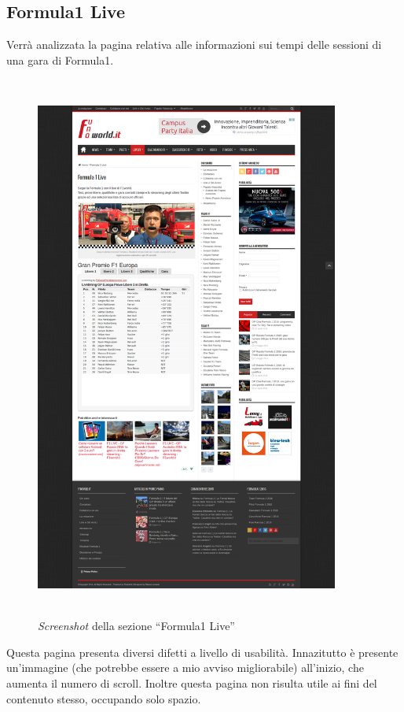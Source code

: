 \subsection{Formula1 Live}

Verrà analizzata la pagina relativa alle informazioni sui tempi delle sessioni
di una gara di Formula1.

\begin{figure}[H]
  \centering
  \includegraphics[height=18cm, width=10cm]{res/img/Formula1Live_Full}
  \caption{\textit{Screenshot} della sezione ``Formula1 Live''}
\end{figure}

Questa pagina presenta diversi difetti a livello di usabilità.
Innazitutto è presente un'immagine (che potrebbe essere a mio avviso
migliorabile) all'inizio, che aumenta il numero di scroll. Inoltre
questa pagina non risulta utile ai fini del contenuto stesso, occupando solo
spazio.

